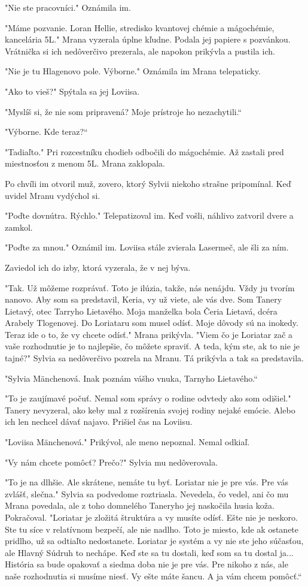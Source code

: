 \documentclass{book}
\begin{document}
"$ $Nie ste pracovníci."$ $ Oznámila im.

"$ $Máme pozvanie. Loran Hellie, stredisko kvantovej chémie a mágochémie, kancelária 5L."$ $ Mrana vyzerala úplne kľudne. Podala jej papiere s pozvánkou. Vrátnička si ich nedôverčivo prezerala, ale napokon prikývla a pustila ich.

"$ $Nie je tu Hlagenovo pole. Výborne."$ $ Oznámila im Mrana telepaticky.

"$ $Ako to vieš?"$ $ Spýtala sa jej Loviisa.

"$ $Myslíš si, že nie som pripravená? Moje prístroje ho nezachytili.“

"$ $Výborne. Kde teraz?“

"$ $Tadiaľto."$ $ Pri rozcestníku chodieb odbočili do mágochémie. Až zastali pred miestnosťou z menom 5L. Mrana zaklopala.

Po chvíli im otvoril muž, zovero, ktorý Sylvii niekoho strašne pripomínal. Keď uvidel Mranu vydýchol si.

"$ $Poďte dovnútra. Rýchlo."$ $ Telepatizoval im. Keď vošli, náhlivo zatvoril dvere a zamkol.

"$ $Poďte za mnou."$ $ Oznámil im. Loviisa stále zvierala Lasermeč, ale šli za ním.

Zaviedol ich do izby, ktorá vyzerala, že v nej býva.

"$ $Tak. Už môžeme rozprávať. Toto je ilúzia, takže, nás nenájdu. Vždy ju tvorím nanovo. Aby som sa predstavil, Keria, vy už viete, ale vás dve. Som Tanery Lietavý, otec Tarryho Lietavého. Moja manželka bola Čeria Lietavá, dcéra Arabely Tlogenovej. Do Loriataru som musel odísť. Moje dôvody sú na inokedy. Teraz ide o to, že vy chcete odísť."$ $ Mrana prikývla. "$ $Viem čo je Loriatar zač a vaše rozhodnutie je to najlepšie, čo môžete spraviť. A teda, kým ste, ak to nie je tajné?"$ $ Sylvia sa nedôverčivo pozrela na Mranu. Tá prikývla a tak sa predstavila.

"$ $Sylvia Mänchenová. Inak poznám vášho vnuka, Tarnyho Lietavého.“

"$ $To je zaujímavé počuť. Nemal som správy o rodine odvtedy ako som odišiel."$ $ Tanery nevyzeral, ako keby mal z rozšírenia svojej rodiny nejaké emócie. Alebo ich len nechcel dávať najavo. Prišiel čas na Loviisu.

"$ $Loviisa Mänchenová."$ $ Prikývol, ale meno nepoznal. Nemal odkiaľ.

"$ $Vy nám chcete pomôcť? Prečo?"$ $ Sylvia mu nedôverovala.

"$ $To je na dlhšie. Ale skrátene, nemáte tu byť. Loriatar nie je pre vás. Pre vás zvlášť, slečna."$ $ Sylvia sa podvedome roztriasla. Nevedela, čo vedel, ani čo mu Mrana povedala, ale z toho domnelého Taneryho jej naskočila husia koža. Pokračoval. "$ $Loriatar je zložitá štruktúra a vy musíte odísť. Ešte nie je neskoro. Ste tu síce v relatívnom bezpečí, ale nie nadlho. Toto je miesto, kde ak ostanete pridlho, už sa odtiaľto nedostanete. Loriatar je systém a vy nie ste jeho súčasťou, ale Hlavný Súdruh to nechápe. Keď ste sa tu dostali, keď som sa tu dostal ja... História sa bude opakovať a siedma doba nie je pre vás. Pre nikoho z nás, ale naše rozhodnutia si musíme niesť. Vy ešte máte šancu. A ja vám chcem pomôcť.“
\end{document}
